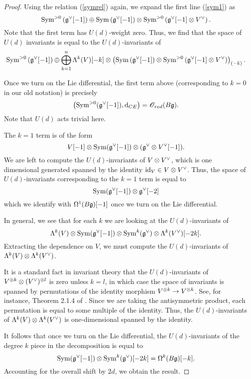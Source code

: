 \begin{proof}
Using the relation (\ref{symrel}) again, we expand the first line (\ref{sym1}) as
\[
 {\rm Sym}^{>0} \left(\mathfrak g^\vee[-1]\right) \oplus {\rm Sym} \left(\mathfrak g^\vee[-1]\right) \otimes {\rm Sym}^{>0} \left(\mathfrak g^\vee [-1] \otimes V^\vee\right) .
 \]
Note that the first term has $U(d)$-weight zero. 
Thus, we find that the space of $U(d)$ invariants is equal to the $U(d)$-invariants of
\[
 {\rm Sym}^{>0} \left(\mathfrak g^\vee[-1]\right) \oplus \bigoplus_{k = 1}^n \Lambda^k(V) [-k] \otimes \left({\rm Sym} \left(\mathfrak g^\vee[-1]\right) \otimes {\rm Sym}^{>0} \left(\mathfrak g^\vee [-1] \otimes V^\vee\right) \right)_{(-k)} .
\]

Once we turn on the Lie differential, the first term above (corresponding to $k=0$ in our old notation) is precisely 
\[
\left({\rm Sym}^{>0}(\mathfrak g^\vee[-1]), {\rm d}_{CE}\right) = \mathscr O_{red}(B \mathfrak g) .
\]
Note that $U(d)$ acts trivial here.

The $k=1$ term is of the form
\[
V[-1] \otimes {\rm Sym} (\mathfrak g^\vee[-1]) \otimes (\mathfrak g^\vee \otimes V^\vee[-1]) .
\]
We are left to compute the $U(d)$-invariants of $V \otimes V^\vee$, which is one dimensional generated spanned by the identity ${\rm id}_V \in V \otimes V^\vee$. 
Thus, the space of $U(d)$-invariants corresponding to the $k=1$ term is equal to 
\[
{\rm Sym} (\mathfrak g^\vee [-1]) \otimes \mathfrak g^\vee [-2] 
\]
which we identify with $\Omega^{1}(B\mathfrak g)[-1]$ once we turn on the Lie differential. 

In general, we see that for each $k$ we are looking at the $U(d)$-invariants of
\[
\Lambda^k(V) \otimes {\rm Sym} (\mathfrak g^\vee[-1]) \otimes {\rm Sym}^k(\mathfrak g^\vee) \otimes \Lambda^k(V^\vee) [-2k]  .
\]
Extracting the dependence on $V$, we must compute the $U(d)$-invariants of $\Lambda^k(V) \otimes \Lambda^k(V^\vee)$.

It is a standard fact in invariant theory that the $U(d)$-invariants of $V^{\otimes k} \otimes (V^\vee)^{\otimes l}$ is zero unless $k=l$, in which case the 
space of invariants is spanned by permutations of the identity morphism $V^{\otimes k} \to V^{\otimes k}$. 
See, for instance, Theorem 2.1.4 of \cite{Fuks}. 
Since we are taking the antisymmetric product, each permutation is equal to some multiple of the identity. 
Thus, the $U(d)$-invariants of $\Lambda^k(V) \otimes \Lambda^k(V^\vee)$ is one-dimensional spanned by the identity. 

It follows that once we turn on the Lie differential, the $U(d)$-invariants of the degree $k$ piece in the decomposition is equal to
\[
{\rm Sym} (\mathfrak g^\vee[-1]) \otimes {\rm Sym}^k(\mathfrak g^\vee) [-2k] = \Omega^{k} (B \mathfrak g) [-k] .
\]
Accounting for the overall shift by $2d$, we obtain the result. 
\end{proof}

